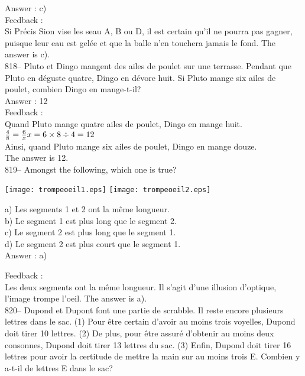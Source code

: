 \documentclass[letterpaper, 12pt]{article}
\begin{document}
Answer : c)\\

Feedback : \\
Si Pr\'ecis Sion vise les seau A, B ou D, il est certain qu'il ne pourra pas
gagner, puisque leur eau est gel\'ee et que la balle n'en touchera jamais le
fond.  The answer is c).\\

818-- Pluto et Dingo mangent des ailes de poulet sur une terrasse.  Pendant
que Pluto en d\'eguste quatre, Dingo en d\'evore huit.  Si Pluto mange six
ailes de poulet, combien Dingo en mange-t-il?\\

Answer : 12\\

Feedback : \\
Quand Pluto mange quatre ailes de poulet, Dingo en mange huit.\\[2mm]
$\frac{4}{8}=\frac{6}{x}\\[2mm]
x=6\times8\div4=12$\\[2mm]
Ainsi, quand Pluto mange six ailes de poulet, Dingo en mange douze.\\[2mm]
The answer is 12.\\





819-- Amongst the following, which one is true?\\
    \begin{center}
    \texttt{[image: trompeoeil1.eps]}
\texttt{[image: trompeoeil2.eps]}
    \end{center}
a) Les segments 1 et 2 ont la m\^eme longueur.\\
b) Le segment 1 est plus long que le segment 2.\\
c) Le segment 2 est plus long que le segment 1.\\
d) Le segment 2 est plus court que le segment 1.\\

Answer : a)

Feedback : \\
Les deux segments ont la m\^eme longueur.  Il s'agit d'une illusion
d'optique, l'image trompe l'oeil.  The answer is a).\\

820-- Dupond et Dupont font une partie de scrabble.  Il reste encore
plusieurs lettres dans le sac.  (1) Pour \^etre certain d'avoir au moins
trois voyelles, Dupond doit tirer 10 lettres.  (2) De plus, pour \^etre
assur\'e d'obtenir au moins deux consonnes, Dupond doit tirer 13 lettres du
sac.  (3) Enfin, Dupond doit tirer 16 lettres pour avoir la certitude de
mettre la main sur au moins trois E. Combien y a-t-il de lettres E dans le
sac?\\
\end{document}
